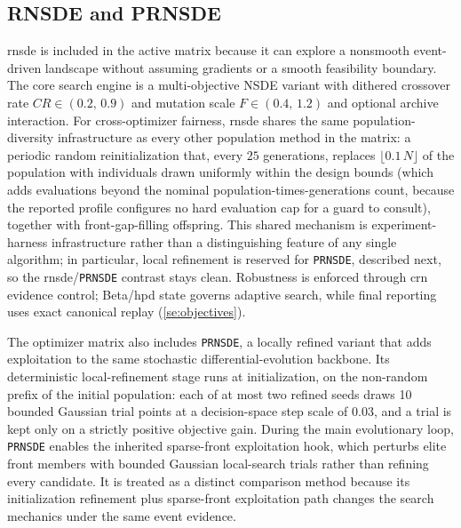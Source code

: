     \subsection{RNSDE and PRNSDE} \label{ss:nsde}
        \gls{rnsde} is included in the active matrix because it can explore a nonsmooth event-driven landscape without assuming gradients or a smooth feasibility boundary. The core search engine is a multi-objective NSDE variant with dithered crossover rate \(CR \in (0.2,\, 0.9)\) and mutation scale \(F \in (0.4,\, 1.2)\) and optional archive interaction. For cross-optimizer fairness, \gls{rnsde} shares the same population-diversity infrastructure as every other population method in the matrix: a periodic random reinitialization that, every \(25\) generations, replaces \(\lfloor 0.1\,N \rfloor\) of the population with individuals drawn uniformly within the design bounds (which adds evaluations beyond the nominal population-times-generations count, because the reported profile configures no hard evaluation cap for a guard to consult), together with front-gap-filling offspring. This shared mechanism is experiment-harness infrastructure rather than a distinguishing feature of any single algorithm; in particular, local refinement is reserved for \texttt{PRNSDE}, described next, so the \gls{rnsde}/\texttt{PRNSDE} contrast stays clean. Robustness is enforced through \gls{crn} evidence control; Beta/\gls{hpd} state governs adaptive search, while final reporting uses exact canonical replay (\cref{se:objectives}).

        The optimizer matrix also includes \texttt{PRNSDE}, a locally refined  variant that adds exploitation to the same stochastic differential-evolution backbone. Its deterministic local-refinement stage runs at initialization, on the non-random prefix of the initial population: each of at most two refined seeds draws \num{10} bounded Gaussian trial points at a decision-space step scale of \num{0.03}, and a trial is kept only on a strictly positive objective gain. During the main evolutionary loop, \texttt{PRNSDE} enables the inherited sparse-front exploitation hook, which perturbs elite front members with bounded Gaussian local-search trials rather than refining every candidate. It is treated as a distinct comparison method because its initialization refinement plus sparse-front exploitation path changes the search mechanics under the same event evidence.


